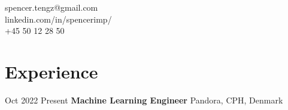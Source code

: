 \documentclass[11pt]{article} %
\begin{document}
{\begin{minipage}[t]{0.8\textwidth}
\end{minipage}\hspace{1mm}
\begin{minipage}[t]{0.22\textwidth}



\begin{tabbing} %

spencer.tengz@gmail.com \\ %
linkedin.com/in/spencerimp/ \\ %
+45 50 12 28 50 \\ %
\end{tabbing}
\end{minipage}


\section{Experience}
\job
{Oct 2022 }{Present}
{\textbf{Machine Learning Engineer}}
{}
{Pandora, CPH, Denmark}
{
	
}}
\end{document}
